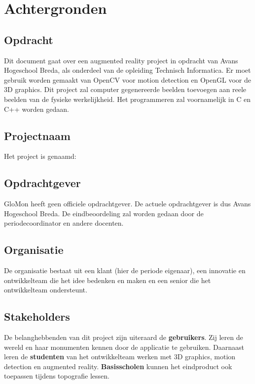 
\chapter{Achtergronden} \label{cha:achtergrond}

\section{Opdracht} \label{sec:opdracht}

Dit document gaat over een augmented reality project in opdracht van Avans Hogeschool Breda, als onderdeel van de opleiding Technisch Informatica. Er moet gebruik worden gemaakt van OpenCV voor motion detection en OpenGL voor de 3D graphics. Dit project zal computer gegenereerde beelden toevoegen aan reele beelden van de fysieke werkelijkheid. Het programmeren zal voornamelijk in C en C++ worden gedaan.

\section{Projectnaam} \label{sec:projectnaam}
Het project is genaamd: \projectname

\section{Opdrachtgever} \label{sec:opdrachtgever}
GloMon heeft geen officiele opdrachtgever. De actuele opdrachtgever is dus Avans Hogeschool Breda. De eindbeoordeling zal worden gedaan door de periodecoordinator en andere docenten.

\section{Organisatie} \label{sec:organisatie}
De organisatie bestaat uit een klant (hier de periode eigenaar), een innovatie en ontwikkelteam die het idee bedenken en maken en een senior die het ontwikkelteam ondersteunt.

\section{Stakeholders} \label{sec:stakeholders}
De belanghebbenden van dit project zijn uiteraard de \textbf{gebruikers}. Zij leren de wereld en haar monumenten kennen door de applicatie te gebruiken. Daarnaast leren de \textbf{studenten} van het ontwikkelteam werken met 3D graphics, motion detection en augmented reality. \textbf{Basisscholen} kunnen het eindproduct ook toepassen tijdens topografie lessen.

